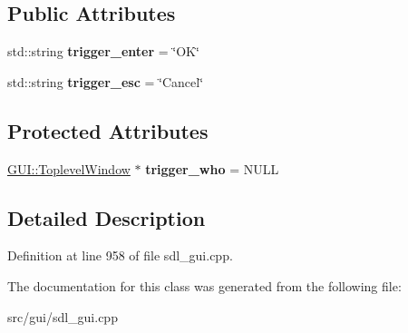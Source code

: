 \subsection*{Public Attributes}
\begin{DoxyCompactItemize}
\item 
\hypertarget{classInputWithEnterKey_ab1f039aa213cc2c6d189a712c456958e}{std\-::string {\bfseries trigger\-\_\-enter} = \char`\"{}O\-K\char`\"{}}\label{classInputWithEnterKey_ab1f039aa213cc2c6d189a712c456958e}

\item 
\hypertarget{classInputWithEnterKey_ad0f1644bc2918baa46e8c63d3193b3fe}{std\-::string {\bfseries trigger\-\_\-esc} = \char`\"{}Cancel\char`\"{}}\label{classInputWithEnterKey_ad0f1644bc2918baa46e8c63d3193b3fe}

\end{DoxyCompactItemize}
\subsection*{Protected Attributes}
\begin{DoxyCompactItemize}
\item 
\hypertarget{classInputWithEnterKey_a28afbaf196623f3534601338135fb6ea}{\hyperlink{classGUI_1_1ToplevelWindow}{G\-U\-I\-::\-Toplevel\-Window} $\ast$ {\bfseries trigger\-\_\-who} = N\-U\-L\-L}\label{classInputWithEnterKey_a28afbaf196623f3534601338135fb6ea}

\end{DoxyCompactItemize}


\subsection{Detailed Description}


Definition at line 958 of file sdl\-\_\-gui.\-cpp.



The documentation for this class was generated from the following file\-:\begin{DoxyCompactItemize}
\item 
src/gui/sdl\-\_\-gui.\-cpp\end{DoxyCompactItemize}
